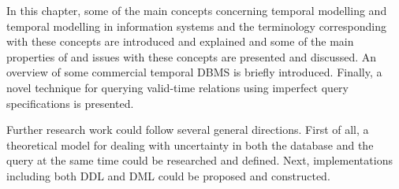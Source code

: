 In this chapter, some of the main concepts concerning temporal modelling and temporal modelling in information systems and the terminology corresponding with these concepts are introduced and explained and some of the main properties of and issues with these concepts are presented and discussed. An overview of some commercial temporal DBMS is briefly introduced. Finally, a novel technique for querying valid-time relations using imperfect query specifications is presented.



Further research work could follow several general directions. First of all, a theoretical model for dealing with uncertainty in both the database and the query at the same time could be researched and defined. Next, implementations including both DDL and DML could be proposed and constructed.

